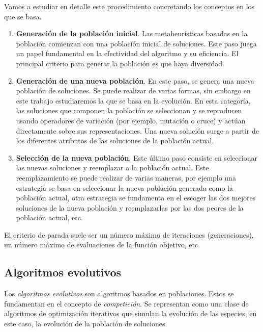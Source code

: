 Vamos a estudiar en detalle este procedimiento concretando los conceptos en los que se basa.

\begin{enumerate}
    \item \textbf{Generación de la población inicial}. Las metaheurísticas basadas en la población comienzan con una población inicial de soluciones. Este paso juega un papel fundamental en la efectividad del algoritmo y su eficiencia. El principal criterio para generar la población es que haya diversidad.
    \item \textbf{Generación de una nueva población}. En este paso, se genera una nueva población de soluciones. Se puede realizar de varias formas, sin embargo en este trabajo estudiaremos la que se basa en la evolución. En esta categoría, las soluciones que componen la población se seleccionan y se reproducen usando operadores de variación (por ejemplo, mutación o cruce) y actúan directamente sobre sus representaciones. Una nueva solución surge a partir de los diferentes atributos de las soluciones de la población actual.
    \item \textbf{Selección de la nueva población}. Este último paso consiste en seleccionar las nuevas soluciones y reemplazar a la población actual. Este reemplazamiento se puede realizar de varias maneras, por ejemplo una estrategia se basa en seleccionar la nueva población generada como la población actual, otra estrategia se fundamenta en el escoger las dos mejores soluciones de la nueva población y reemplazarlas por las dos peores de la población actual, etc.
\end{enumerate}

El criterio de parada suele ser un número máximo de iteraciones (generaciones), un número máximo de evaluaciones de la función objetivo, etc.

\subsection{Algoritmos evolutivos}

Los \emph{algoritmos evolutivos} son algoritmos basados en poblaciones. Estos se fundamentan en el concepto de \emph{competición}. Se representan como una clase de algoritmos de optimización iterativos que simulan la evolución de las especies, en este caso, la evolución de la población de soluciones.

